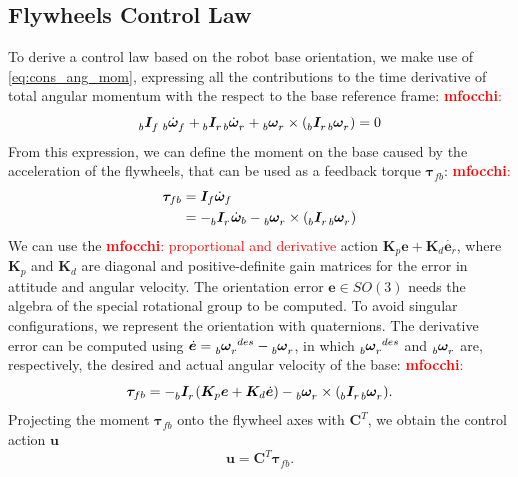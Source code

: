 \documentclass[sensors,article,submit,pdftex,moreauthors]{Definitions/mdpi}
\newcommand{\MF}[1]{\textcolor{red}{\textbf{mfocchi}: #1}}
\begin{document}
\subsection{Flywheels Control Law}
\label{subsec:control_law}
To derive a control law based on the robot base orientation, we make use of \eqref{eq:cons_ang_mom}, expressing all the contributions to the time derivative of total angular momentum with the respect to the base reference frame:
\MF{\begin{equation}
\tensor[_b]{\bm{I}}{_f} \, \tensor[_b]{\dot{\bm{\omega}}}{_f} + \tensor[_b]{\bm{I}}{_r} \tensor[_b]{\dot{\bm{\omega}}}{_r} + \tensor[_b]{\bm{\omega}}{_r} \times \left( \tensor[_b]{\bm{I}}{_r} \tensor[_b]{\bm{\omega}}{_r}\right) = 0
\end{equation}}
From this expression, we can define the moment on the base caused by the acceleration of the flywheels, that can be used as a feedback torque $\bm{\tau}_{fb}$:
\MF{\begin{equation}
\begin{split}
\bm{\tau}_{fb} &= \bm{I}_f \dot{\bm{\omega}}_f \\
&= - \tensor[_b]{\bm{I}}{_r} \dot{\bm{\omega}}_b - \tensor[_b]{\bm{\omega}}{_r} \times \left( \tensor[_b]{\bm{I}}{_r} \tensor[_b]{\bm{\omega}}{_r}\right)
\end{split}
\end{equation}}
We can use the \MF{proportional and derivative} action $\bm{K}_p \bm{e} + \bm{K}_d \dot{\bm{e}_r}$, where $\bm{K}_p$ and $\bm{K}_d$ are diagonal and positive-definite gain matrices for the error in attitude and angular velocity.
The orientation error $\bm{e} \in SO(3)$ needs the algebra of the special rotational group to be computed. To avoid singular configurations, we represent the orientation with quaternions.
The derivative error can be computed using $\dot{\bm{e}} = \tensor[_b]{\bm{\omega}}{_r^{des}} - \tensor[_b]{\bm{\omega}}{_r}$, in which $\tensor[_b]{\bm{\omega}}{_r^{des}}$ and $\tensor[_b]{\bm{\omega}}{_r}$ are, respectively, the desired and actual angular velocity of the base:
\MF{\begin{equation}
\bm{\tau}_{fb} = - \tensor[_b]{\bm{I}}{_r} \left(\bm{K}_p \bm{e} + \bm{K}_d \dot{\bm{e}}\right) - \tensor[_b]{\bm{\omega}}{_r} \times \left( \tensor[_b]{\bm{I}}{_r} \tensor[_b]{\bm{\omega}}{_r}\right).
\end{equation}}
Projecting the moment $\bm{\tau}_{fb}$ onto the flywheel axes with $\bm{C}^T$, we obtain the control action $\bm{u}$
\begin{equation}
\label{eq:ctrl_law}
\bm{u} = \bm{C}^T \bm{\tau}_{fb}.
\end{equation}
\end{document}
